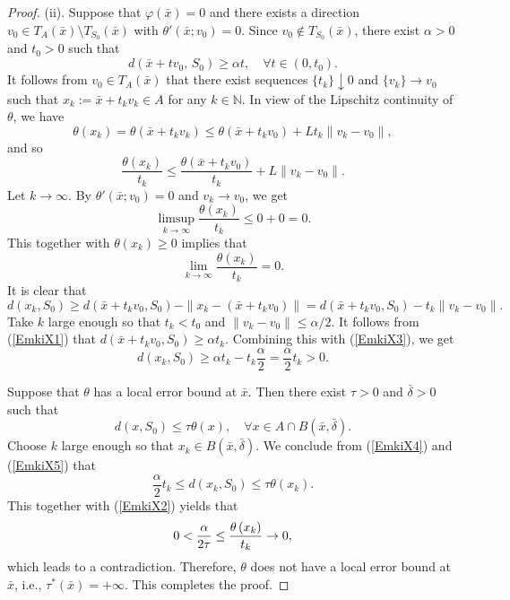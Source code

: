 \documentclass[11pt]{article}
\begin{document}
\begin{proof}
	
	(ii).    Suppose that $	\varphi(\bar{x}) = 0$ and there exists a direction $v_0\in T_A(\bar{x})\setminus T_{S_0}(\bar{x})$ with $\theta'(\bar{x};v_0)=0$. 
	Since $v_0\notin T_{S_0}(\bar{x})$,    there exist  $\alpha>0$ and $t_0>0$ such that
	\begin{equation}\label{EmkiX1}
		d(\bar{x}+t v_0,\,S_0) \ge \alpha t,    \quad   \forall t\in(0,t_0).
	\end{equation}
	It follows from $v_0\in T_A(\bar{x})$ that    there exist sequences $\{t_k\}\downarrow 0$ and $\{v_k\}\to v_0$ such that    $	x_k := \bar{x}+t_k v_k \in A $ for any $k\in\mathbb{N}$.
	In view of the Lipschitz continuity of $\theta$,  we have
	\[
	\theta(x_k) = \theta(\bar{x}+t_k v_k) \le \theta(\bar{x}+t_k v_0) + L t_k \|v_k - v_0\|,
	\]
	and so
	\[
	\frac{\theta(x_k)}{t_k} \le \frac{\theta(\bar{x}+t_k v_0)}{t_k} + L \|v_k - v_0\|.
	\]
	Let $k\to\infty$.  By   $\theta'(\bar{x};v_0)=0$ and $v_k\to v_0$, we get
	\[
	\limsup_{k\to\infty} \frac{\theta(x_k)}{t_k} \le 0 + 0 = 0.
	\]
	This together with $\theta(x_k) \ge 0$   implies that
	\begin{equation}\label{EmkiX2}
		\lim_{k\to\infty} \frac{\theta(x_k)}{t_k} = 0.
	\end{equation}
	It is clear that
	\begin{equation}\label{EmkiX3}
		d(x_k, S_0) \ge d(\bar{x}+t_k v_0, S_0) - \|x_k - (\bar{x}+t_k v_0)\| = d(\bar{x}+t_k v_0, S_0) - t_k \|v_k - v_0\|.
	\end{equation}
	Take $k$ large enough so that $t_k < t_0$ and $\|v_k - v_0\| \le \alpha/2$.    It follows from  (\ref{EmkiX1})  that  $d(\bar{x}+t_k v_0, S_0) \ge \alpha t_k$.  Combining this with  (\ref{EmkiX3}), we get
	\begin{equation}\label{EmkiX4}
		d(x_k, S_0) \ge \alpha t_k - t_k\frac{\alpha}{2} = \frac{\alpha}{2} t_k > 0.  
	\end{equation}
	
	Suppose that $\theta$ has a  local error bound at $\bar x$.
	Then  there exist $\tau>0$ and $\bar{\delta } >0$ such that
	\begin{equation}\label{EmkiX5}
		d(x,S_0)\le \tau\theta(x),   \quad  \forall x\in A\cap B(\bar{x},\bar{\delta }).
	\end{equation}
	Choose $k$ large enough so that $x_k\in B(\bar{x},\bar{\delta })$.   We conclude from  (\ref{EmkiX4})  and  (\ref{EmkiX5})  that
	\[
	\frac{\alpha}{2} t_k \le d(x_k, S_0) \le \tau \theta(x_k) .
	\]
	This together with    (\ref{EmkiX2})    yields   that 
	$$ 0 < {\alpha  \over 2 \tau} \le {{   \theta \left( {{x_k}} \right)} \over {{t_k}}} \to 0,$$
	which leads to a contradiction.  Therefore, $\theta$ does not have a local error bound at $\bar{x}$, i.e., $\tau^*(\bar{x}) = +\infty$.  This completes the proof. 
\end{proof}  
\end{document}
